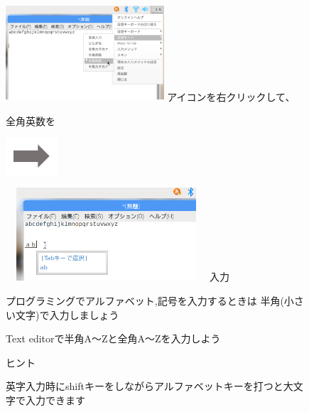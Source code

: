 \documentclass[a4paper,12pt]{jarticle}
\begin{document}
\begin{figure}[ht]
  \begin{minipage}{7.173cm}
    \includegraphics[width=5.889cm,height=3.596cm]{textbook-img069.png}
     アイコンを右クリックして、

    全角英数を
  \end{minipage}
  \includegraphics[width=1.919cm,height=1.365cm]{textbook-img053.png}
  \begin{minipage}{7.178cm}
    \includegraphics[width=7.471cm,height=3.469cm]{textbook-img070.png}
     入力
  \end{minipage}

  \vspace{3mm}
  \begin{minipage}{16.578cm}
    {\centering\large
      プログラミングでアルファベット,記号を入力するときは
      半角(小さい文字)で入力しましょう
    }
  \end{minipage}

  \flushleft
  \theQuestion\label{Q:hasAnswer02-5}

  Text editorで半角A〜Zと全角A〜Zを入力しよう

  ヒント


  英字入力時にshiftキーをしながらアルファベットキーを打つと大文字で入力できます
\end{figure}
\clearpage
\end{document}
